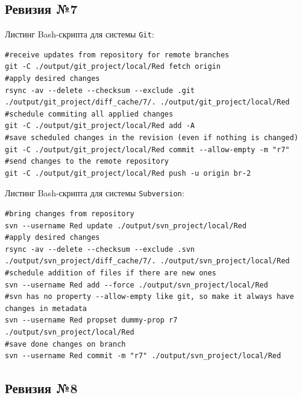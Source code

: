 \subsection{Ревизия №7}

Листинг Bash-скрипта для системы \texttt{Git}:
\begin{lstlisting}
#receive updates from repository for remote branches
git -C ./output/git_project/local/Red fetch origin
#apply desired changes
rsync -av --delete --checksum --exclude .git ./output/git_project/diff_cache/7/. ./output/git_project/local/Red
#schedule commiting all applied changes
git -C ./output/git_project/local/Red add -A
#save scheduled changes in the revision (even if nothing is changed)
git -C ./output/git_project/local/Red commit --allow-empty -m "r7"
#send changes to the remote repository
git -C ./output/git_project/local/Red push -u origin br-2
\end{lstlisting}

Листинг Bash-скрипта для системы \texttt{Subversion}:
\begin{lstlisting}
#bring changes from repository
svn --username Red update ./output/svn_project/local/Red
#apply desired changes
rsync -av --delete --checksum --exclude .svn ./output/svn_project/diff_cache/7/. ./output/svn_project/local/Red
#schedule addition of files if there are new ones
svn --username Red add --force ./output/svn_project/local/Red
#svn has no property --allow-empty like git, so make it always have changes in metadata
svn --username Red propset dummy-prop r7 ./output/svn_project/local/Red
#save done changes on branch
svn --username Red commit -m "r7" ./output/svn_project/local/Red
\end{lstlisting}


\subsection{Ревизия №8}

